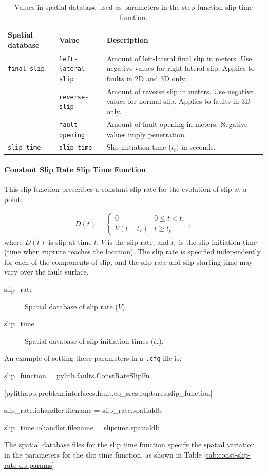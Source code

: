 \begin{table}[htbp]
\caption{Values in spatial database used
as parameters in the step function slip time function.}
\label{tab:step-function-db-params}
\begin{tabular}{llp{2.5in}}
\textbf{Spatial database} & \textbf{Value} & \textbf{Description}\\
\hline 
\texttt{final\_slip} & \texttt{left-lateral-slip} & Amount of left-lateral final slip in meters. Use negative values for
right-lateral slip. Applies to faults in 2D and 3D only.\\
 & \texttt{reverse-slip} & Amount of reverse slip in meters. Use negative values for normal slip.
Applies to faults in 3D only.\\
 & \texttt{fault-opening} & Amount of fault opening in meters. Negative values imply penetration.\\
\hline 
\texttt{slip\_time} & \texttt{slip-time} & Slip initiation time ($t_{t})$ in seconds.\\
\hline 
\end{tabular}
\end{table}


\paragraph{Constant Slip Rate Slip Time Function}

This slip function prescribes a constant slip rate for the evolution
of slip at a point: 

\begin{gather}
D(t)=\left\{ \begin{array}{cc}
0 & 0\leq t<t_{r}\\
V(t-t_{r}) & t\ge t_{r}
\end{array}\right.\,,
\end{gather}
where $D(t)$ is slip at time $t$, $V$ is the slip rate, and $t_{r}$
is the slip initiation time (time when rupture reaches the location).
The slip rate is specified independently for each of the components
of slip, and the slip rate and slip starting time may vary over the
fault surface.
\begin{description}
\item [{slip\_rate}] Spatial database of slip rate ($V)$.
\item [{slip\_time}] Spatial database of slip initiation times ($t_{r}$).
\end{description}
An example of setting these parameters in a \texttt{.cfg} file is:
\begin{lyxcode}

slip\_function = pylith.faults.ConstRateSlipFn 

[pylithapp.problem.interfaces.fault.eq\_srcs.ruptures.slip\_function]

slip\_rate.iohandler.filename = slip\_rate.spatialdb

slip\_time.iohandler.filename = sliptime.spatialdb
\end{lyxcode}
The spatial database files for the slip time function specify the
spatial variation in the parameters for the slip time function, as
shown in Table \vref{tab:const-slip-rate-db-params}.

